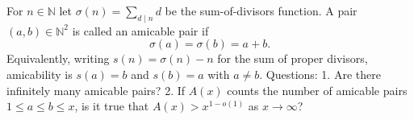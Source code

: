 For $n\in\mathbb{N}$ let $\sigma(n)=\sum_{d\mid n} d$ be the sum-of-divisors function.
A pair $(a,b)\in\mathbb{N}^2$ is called an amicable pair if
\[
\sigma(a)=\sigma(b)=a+b.
\]
Equivalently, writing $s(n)=\sigma(n)-n$ for the sum of proper divisors, amicability is $s(a)=b$ and $s(b)=a$ with $a\ne b$.
Questions:
1. Are there infinitely many amicable pairs?
2. If $A(x)$ counts the number of amicable pairs $1\le a\le b\le x$, is it true that $A(x)>x^{1-o(1)}$ as $x\to\infty$?
